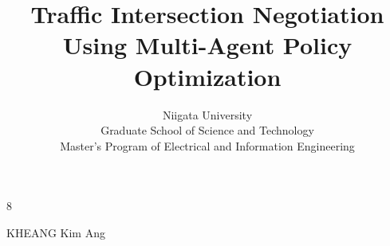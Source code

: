 



\begin{toppage}
  \title{Traffic Intersection Negotiation Using Multi-Agent Policy Optimization}{8}

  \author{Niigata University\\Graduate School of Science and Technology\\Master's Program of Electrical and Information Engineering }{KHEANG Kim Ang}
\end{toppage}



\contents
\listoffigures
\listoftables







% 






